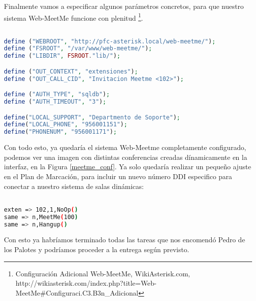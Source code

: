 Finalmente vamos a especificar algunos parámetros concretos, para que nuestro sistema Web-MeetMe funcione con plenitud \footnote{Configuración Adicional Web-MeetMe, WikiAsterisk.com, \\ http://wikiasterisk.com/index.php?title=Web-MeetMe\#Configuraci.C3.B3n\_Adicional}.

\begin{lstlisting}[language=php,title={/var/www/web-meetme/lib/defines.php}]

define ("WEBROOT", "http://pfc-asterisk.local/web-meetme/");
define ("FSROOT", "/var/www/web-meetme/");
define ("LIBDIR", FSROOT."lib/");

define ("OUT_CONTEXT", "extensiones");
define ("OUT_CALL_CID", "Invitacion Meetme <102>");

define ("AUTH_TYPE", "sqldb");
define ("AUTH_TIMEOUT", "3");

define("LOCAL_SUPPORT", "Departmento de Soporte");
define("LOCAL_PHONE", "956001151");
define("PHONENUM", "956001171");

\end{lstlisting}

Con todo esto, ya quedaría el sistema Web-Meetme completamente configurado, podemos ver una imagen con distintas conferencias creadas dínamicamente en la interfaz, en la Figura \ref{meetme_conf}. Ya solo quedaría realizar un pequeño ajuste en el Plan de Marcación, para incluir un nuevo número DDI especifico para conectar a nuestro sistema de salas dinámicas:


\begin{lstlisting}[language=bash,title={/etc/asterisk/extensions.conf}]

exten => 102,1,NoOp()
same => n,MeetMe(100)
same => n,Hangup()

\end{lstlisting}

Con esto ya habríamos terminado todas las tareas que nos encomendó Pedro de los Palotes y podríamos proceder a la entrega según previsto.

